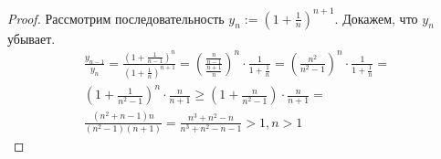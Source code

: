 \begin{proof}
	Рассмотрим последовательность $y_n := (1 + \frac{1}{n})^{n + 1}$. Докажем, что $y_n$ убывает.
	\begin{multline*}
		\frac{y_{n - 1}}{y_n} = \frac{(1 + \frac{1}{n - 1})^n}{(1 + \frac{1}{n})^{n + 1}} = \left(\frac{\frac{n}{n - 1}}{\frac{n + 1}{n}}\right)^n \cdot \frac{1}{1 + \frac{1}{n}} = \left(\frac{n^2}{n^2 - 1}\right)^n \cdot \frac{1}{1 + \frac{1}{n}} = \\
		(1 + \frac{1}{n^2 - 1})^n \cdot \frac{n}{n + 1} \ge (1 + \frac{n}{n^2 - 1}) \cdot \frac{n}{n + 1} = \\
		\frac{(n^2 + n - 1)n}{(n^2 - 1)(n + 1)} = \frac{n^3 + n^2 - n}{n^3 + n^2 - n - 1} > 1, n > 1
	\end{multline*}
\end{proof}